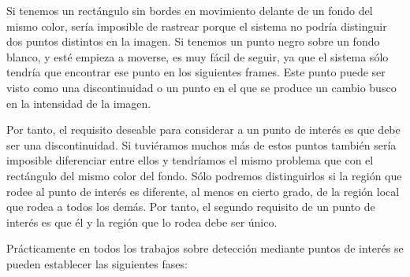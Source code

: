 Si tenemos un rectángulo sin bordes en movimiento delante de un fondo del mismo color, sería imposible de rastrear porque el sistema no podría distinguir dos puntos distintos en la imagen. Si tenemos un punto negro sobre un fondo blanco, y esté empieza a moverse, es muy fácil de seguir, ya que el sistema sólo tendría que encontrar ese punto en los siguientes frames. Este punto puede ser visto como una discontinuidad o un punto en el que se produce un cambio busco en la intensidad de la imagen.

Por tanto, el requisito deseable para considerar a un punto de interés es que debe ser una discontinuidad. Si tuviéramos muchos más de estos puntos también sería imposible diferenciar entre ellos y tendríamos el mismo problema que con el rectángulo del mismo color del fondo. Sólo podremos distinguirlos si la región que rodee al punto de interés es diferente, al menos en cierto grado, de la región local que rodea a todos los demás. Por tanto, el segundo requisito de un punto de interés es que él y la región que lo rodea debe ser único. 

Prácticamente en todos los trabajos sobre detección mediante puntos de interés se pueden establecer las siguientes fases:

